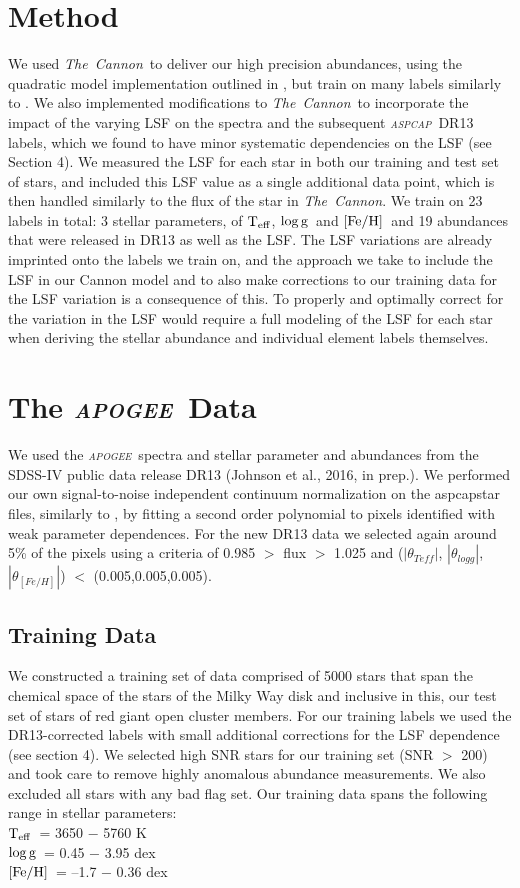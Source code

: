 \documentclass[14pt, preprint2]{aastex6}
\newcommand{\project}[1]{\textsl{#1}}
\newcommand{\tc}{\project{The~Cannon}}
\newcommand{\apogee}{\project{\textsc{apogee}}}
\newcommand{\aspcap}{\project{\textsc{aspcap}}}
\newcommand{\teff}{\mbox{$\rm T_{eff}$}}
\newcommand{\feh}{\mbox{$\rm [Fe/H]$}}
\newcommand{\logg}{\mbox{$\rm \log g$}}
\begin{document}
\section{Method}

We used \tc\ to deliver our high precision abundances, using the quadratic model implementation outlined in \citet{Ness2015}, but train on many labels similarly to \citet{Casey2016}. We also implemented modifications to \tc\ to incorporate the impact of the varying LSF on the spectra and the subsequent \aspcap\ DR13 labels, which we found to have minor systematic dependencies on the LSF (see Section 4).  We measured the LSF for each star in both our training and test set of stars, and included this LSF value as a single additional data point, which is then handled similarly to the flux of the star in \tc. We train on 23 labels in total: 3 stellar parameters, of \teff, \logg\ and \feh\ and 19 abundances that were released in DR13 as well as the LSF.  The LSF variations are already imprinted onto the labels we train on, and the approach we take to include the LSF in our Cannon model and to also make corrections to our training data for the LSF variation is a consequence of this. To properly and optimally correct for the variation in the LSF would require a full modeling of the LSF for each star when deriving the stellar abundance and individual element labels themselves.

\section{The \apogee\ Data}

We used the \apogee\ spectra and stellar parameter and abundances from the SDSS-IV public data release DR13 (Johnson et al., 2016, in prep.). We performed our own signal-to-noise independent continuum normalization on the aspcapstar files, similarly to \citet{Ness2015}, by fitting a second order polynomial to pixels identified with weak parameter dependences. For the new DR13 data we selected again around 5\% of the pixels using a criteria of 0.985 $>$ flux $>$ 1.025 and ($|\theta_{Teff}|$, $|\theta_{logg}|$, $|\theta_{[Fe/H]}|$) $<$  (0.005,0.005,0.005). 

\subsection{Training Data} 

We constructed a training set of data comprised of 5000 stars that span the chemical space of the stars of the Milky Way disk and inclusive in this, our test set of stars of red giant open cluster members.  For our training labels we used the DR13-corrected labels with small additional corrections for the LSF dependence (see section 4). We selected high SNR stars for our training set (SNR $>$ 200) and took care to remove highly anomalous abundance measurements. We also excluded all stars with any bad flag set.  Our training data spans the following range in stellar parameters:\\
\teff\ = 3650 $-$ 5760 K  \\
\logg\ = 0.45 $-$ 3.95 dex \\
\feh\ = --1.7 $-$ 0.36 dex \\
\end{document}
